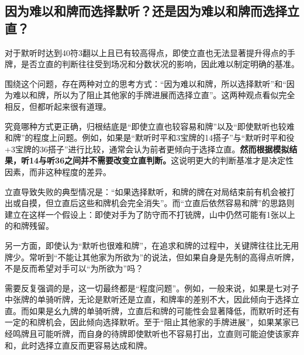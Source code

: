\subsection{因为难以和牌而选择默听？还是因为难以和牌而选择立直？}
对于默听时达到40符3翻以上且已有较高得点，即使立直也无法显著提升得点的手牌，是否立直的判断往往受到场况和分数状况的影响，因此难以制定明确的基准。

围绕这个问题，存在两种对立的思考方式：“因为难以和牌，所以选择默听”和“因为难以和牌，所以为了阻止其他家的手牌进展而选择立直”。这两种观点看似完全相反，但都听起来很有道理。

究竟哪种方式更正确，归根结底是“即使立直也较容易和牌”以及“即使默听也较难和牌”的程度上问题。例如，如果是“默听时平和3宝牌的14搭子”与“默听时平和役+3宝牌的36搭子”进行比较，通常会认为前者更倾向于选择立直。\textbf{然而根据模拟结果，听14与听36之间并不需要改变立直判断。}这说明更大的判断基准才是决定性因素，而非这种程度的差异。

立直导致失败的典型情况是：“如果选择默听，和牌的牌在对局结束前有机会被打出或自摸，但立直后这些和牌机会完全消失”。而“立直后依然容易和牌”的思路则建立在这样一个假设上：即使对手为了防守而不打铳牌，山中仍然可能有1张以上的和牌残留。

另一方面，即使认为“默听也很难和牌”，在追求和牌的过程中，关键牌往往比无用牌少。常听到“不能让其他家为所欲为”的说法，但如果自身是先制的高得点听牌，不是反而希望对手可以“为所欲为”吗？

需要反复强调的是，这一切最终都是“程度问题”。例如，一般来说，如果是七对子中张牌的单骑听牌，无论是默听还是立直，和牌率的差别不大，因此倾向于选择立直。而如果是幺九牌的单骑听牌，立直后和牌的可能性会显著降低，而默听时还有一定的和牌机会，因此倾向选择默听。至于“阻止其他家的手牌进展”，如果某家已经鸣牌且可能听牌，而自身的待牌即使默听也不容易打出，立直则可能迫使该家弃和，此时选择立直反而更容易达成和牌。
